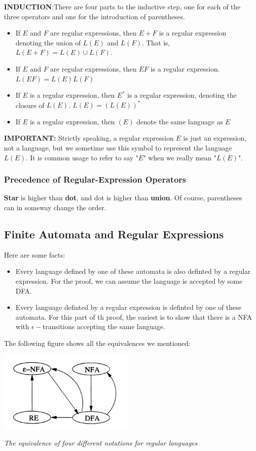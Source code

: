 \documentclass[12pt,reqno]{amsart}
\begin{document}
\textbf{INDUCTION}:There are four parts to the inductive step, one for each of the three operators and one for the introduction of parentheses.
\begin{itemize}
	\item If $E$ and $F$ are regular expressions, then $E+F$ is a regular expression denoting the union of $L(E)$ and $L(F)$. That is, $L(E+F)=L(E)\cup L(F)$.
	\item If $E$ and $F$ are regular expressions, then $EF$ is a regular expression. $L(EF) = L(E)L(F)$
	\item If $E$ is a regular expression, then $E^*$ is a regular expression, denoting the closure of $L(E)$. $L(E) = (L(E))^*$
	\item If $E$ is a regular expression, then $(E)$ denote the same language as $E$
\end{itemize}
\textbf{IMPORTANT:} Strictly speaking, a regular expression $E$ is just an expression, not a language, but we sometime use this symbol to represent the language $L(E)$. It is common usage to refer to say "$E$" when we really mean "$L(E)$".	 

\subsubsection{Precedence of Regular-Expression Operators}
\textbf{Star} is higher than \textbf{dot}, and dot is higher than \textbf{union}. Of course, parentheses can in someway change the order.

\subsection{Finite Automata and Regular Expressions}
Here are some facts:
\begin{itemize}
	\item Every language defined by one of these automata is also definted by a regular expression. For the proof, we can assume the language is accepted by some DFA.
	\item Every language definted by a regular expression is definted by one of these automata. For this part of th proof, the easiest is to show that there is a NFA with $\epsilon-$transitions accepting the same language. 
\end{itemize}
	
The following figure shows all the equivalences we mentioned:
	
\begin{center}
	\includegraphics[width=0.5\textwidth]{equal}
		
	\textit{The equivalence of four different notations for regular languages}
\end{center}
	
\end{document}
